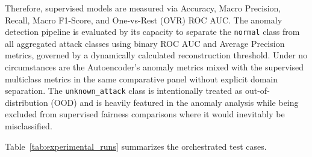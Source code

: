 \documentclass[conference]{IEEEtran}
\begin{document}
Therefore, supervised models are measured via Accuracy, Macro Precision, Recall, Macro F1-Score, and One-vs-Rest (OVR) ROC AUC. The anomaly detection pipeline is evaluated by its capacity to separate the \texttt{normal} class from all aggregated attack classes using binary ROC AUC and Average Precision metrics, governed by a dynamically calculated reconstruction threshold. Under no circumstances are the Autoencoder's anomaly metrics mixed with the supervised multiclass metrics in the same comparative panel without explicit domain separation. The \texttt{unknown\_attack} class is intentionally treated as out-of-distribution (OOD) and is heavily featured in the anomaly analysis while being excluded from supervised fairness comparisons where it would inevitably be misclassified.

Table~\ref{tab:experimental_runs} summarizes the orchestrated test cases.
\end{document}
